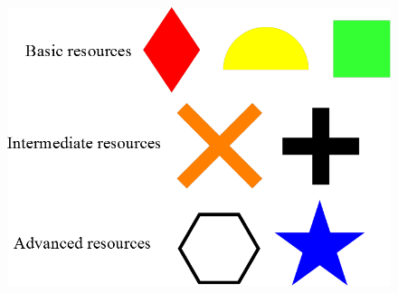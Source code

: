 \documentclass[]{article}
\begin{document}
\begin{figure}[h]
\begin{minipage}{.4\textwidth}
  \centering
  \includegraphics[scale=0.25]{cheatsheet}
  \label{fig:test1}
\end{minipage}%
\begin{minipage}{.3\textwidth}
  \centering

\end{minipage}
\end{figure}
\end{document}

